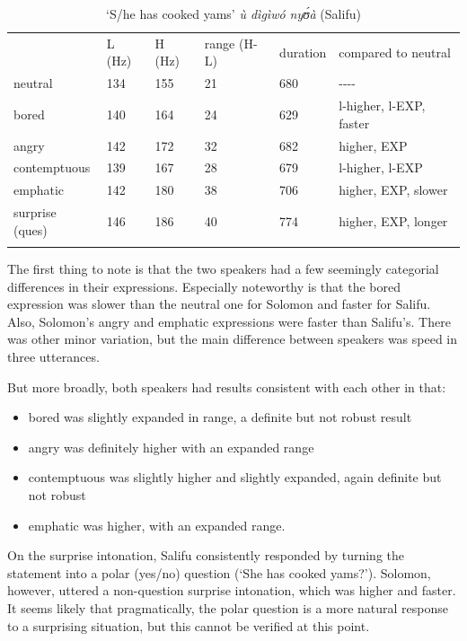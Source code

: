 \documentclass[output=paper]{langsci/langscibook}
\begin{document}
\begin{table}
\begin{tabular}{llllll} & L (Hz) & H (Hz) & range (H-L) & duration & compared to neutral\\
\lsptoprule
neutral & 134 & 155 & 21 & 680 & {}-{}-{}-{}-\\
bored & 140 & 164 & 24 & 629 & l-higher, l-EXP, faster\\
angry & 142 & 172 & 32 & 682 & higher, EXP\\
contemptuous & 139 & 167 & 28 & 679 & l-higher, l-EXP\\
emphatic & 142 & 180 & 38 & 706 & higher, EXP, slower\\
surprise (ques) & 146 & 186 & 40 & 774 & higher, EXP, longer\\
\lspbottomrule
\end{tabular}

\caption{`S/he has cooked yams' \emph{ù dìgìwó nyʊ́à} (Salifu)}
\label{tab:4.cahill}

\end{table}



The first thing to note is that the two speakers had a few seemingly categorial differences in their expressions. Especially noteworthy is that the bored expression was slower than the neutral one for Solomon and faster for Salifu. Also, Solomon's angry and emphatic expressions were faster than Salifu's. There was other minor variation, but the main difference between speakers was speed in three utterances.

But more broadly, both speakers had results consistent with each other in that:

\begin{itemize}
\item bored was slightly expanded in range, a definite but not robust result
\item angry was definitely higher with an expanded range
\item contemptuous was slightly higher and slightly expanded, again definite but not robust
\item emphatic was higher, with an expanded range. 
\end{itemize}

On the surprise intonation, Salifu consistently responded by turning the statement into a polar (yes/no) question (`She has cooked yams?'). Solomon, however, uttered a non-question surprise intonation, which was higher and faster. It seems likely that pragmatically, the polar question is a more natural response to a surprising situation, but this cannot be verified at this point. 
\end{document}
